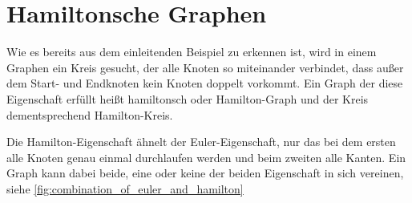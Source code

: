 \documentclass{article}
\begin{document}



%
%
%
\section{Hamiltonsche Graphen}

Wie es bereits aus dem einleitenden Beispiel zu erkennen ist, wird in einem Graphen ein Kreis gesucht, der alle Knoten so miteinander verbindet, dass außer dem Start- und Endknoten kein Knoten doppelt vorkommt. Ein Graph der diese Eigenschaft erfüllt heißt hamiltonsch oder Hamilton-Graph und der Kreis dementsprechend Hamilton-Kreis.

Die Hamilton-Eigenschaft ähnelt der Euler-Eigenschaft, nur das bei dem ersten alle Knoten genau einmal durchlaufen werden und beim zweiten alle Kanten. Ein Graph kann dabei beide, eine oder keine der beiden Eigenschaft in sich vereinen, siehe \autoref{fig:combination_of_euler_and_hamilton}
\end{document}
